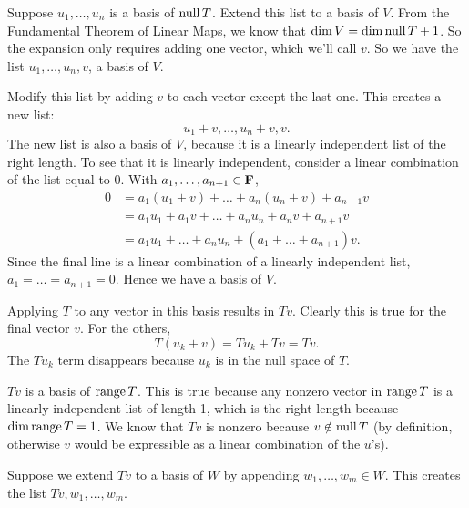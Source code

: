 \documentclass[a5paper]{article}
\begin{document}
    Suppose $u_1,\dots,u_n$ is a basis of $\operatorname{null}T$.
    Extend this list to a basis of $V$.
    From the Fundamental Theorem of Linear Maps, we know that $\operatorname{dim}V = \operatorname{dim}\operatorname{null}T + 1$.
    So the expansion only requires adding one vector, which we'll call $v$.
    So we have the list $u_1, \dots, u_n, v$, a basis of $V$.

    Modify this list by adding $v$ to each vector except the last one.
    This creates a new list:
\begin{equation*}
        u_1+v, \dots, u_n+v, v .
\end{equation*}
    The new list is also a basis of $V$, because it is a linearly independent list of the right length.
    To see that it is linearly independent, consider a linear combination of the list equal to 0.
    With $a_1,\dots,a_{n+1} \in \mathbf{F}$,
\begin{align*}
        0 &= a_1(u_1 + v) + \dots + a_n(u_n + v) + a_{n+1}v \\
          &= a_1u_1 + a_1v + \dots + a_nu_n + a_nv + a_{n+1}v \\
          &= a_1u_1 + \dots + a_nu_n + (a_1 + \dots + a_{n+1})v .
\end{align*}
    Since the final line is a linear combination of a linearly independent list, $a_1=\dots=a_{n+1}=0$.
    Hence we have a basis of $V$.

    Applying $T$ to any vector in this basis results in $Tv$.
    Clearly this is true for the final vector $v$.
    For the others,
\begin{equation*}
        T(u_k + v) = Tu_k + Tv = Tv .
\end{equation*}
    The $Tu_k$ term disappears because $u_k$ is in the null space of $T$.

    $Tv$ is a basis of $\operatorname{range}T$.
    This is true because any nonzero vector in $\operatorname{range}T$ is a linearly independent list of length 1, which is the right length because $\operatorname{dim}\operatorname{range}T = 1$.
    We know that $Tv$ is nonzero because $v \notin \operatorname{null}T$ (by definition, otherwise $v$ would be expressible as a linear combination of the $u$'s).

    Suppose we extend $Tv$ to a basis of $W$ by appending $w_1,\dots,w_m \in W$.
    This creates the list $Tv, w_1, \dots, w_m$.
\end{document}
